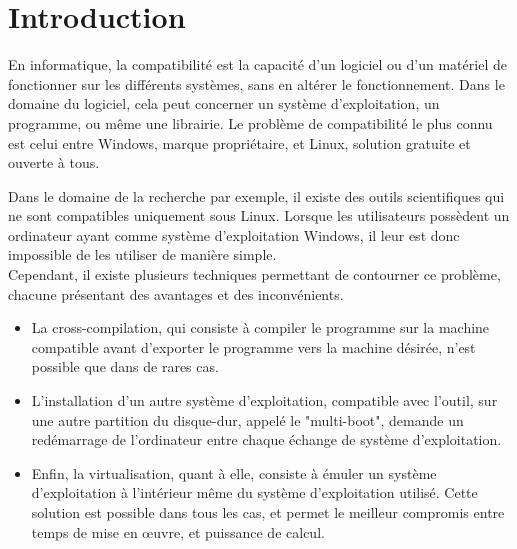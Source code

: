 \cleardoublepage



\chapter*{Introduction}



En informatique, la compatibilité est la capacité d'un logiciel ou d'un matériel de fonctionner sur les différents systèmes, sans en altérer le fonctionnement.
Dans le domaine du logiciel, cela peut concerner un système d'exploitation, un programme, ou même une librairie.
Le problème de compatibilité le plus connu est celui entre Windows, marque propriétaire, et Linux, solution gratuite et ouverte à tous.



Dans le domaine de la recherche par exemple, il existe des outils scientifiques qui ne sont compatibles uniquement sous Linux.
Lorsque les utilisateurs possèdent un ordinateur ayant comme système d'exploitation Windows, il leur est donc impossible de les utiliser de manière simple.
\\




Cependant, il existe plusieurs techniques permettant de contourner ce problème, chacune présentant des avantages et des inconvénients.
\begin{itemize}
	\item La cross-compilation, qui consiste à compiler le programme sur la machine compatible avant d'exporter le programme vers la machine désirée, n'est possible que dans de rares cas.
	\item L'installation d'un autre système d'exploitation, compatible avec l'outil, sur une autre partition du disque-dur, appelé le "multi-boot", demande un redémarrage de l'ordinateur entre chaque échange de système d'exploitation.
	\item Enfin, la virtualisation, quant à elle, consiste à émuler un système d'exploitation à l'intérieur même du système d'exploitation utilisé.
Cette solution est possible dans tous les cas, et permet le meilleur compromis entre temps de mise en œuvre, et puissance de calcul.
\\
\end{itemize}



